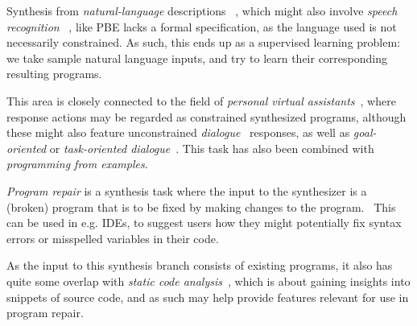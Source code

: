 \documentclass{article}
\begin{document}

Synthesis from \emph{natural-language} descriptions%
~\citep{neuralprogrammer,zhong2017seq2sql},
which might also involve \emph{speech recognition}%
~\citep{juang1991hidden,graves2013speech},
like PBE
lacks a formal specification,
as the language used is not necessarily constrained.
As such, this ends up as a supervised learning problem:
we take sample natural language inputs,
and try to learn their corresponding resulting programs.

This area is closely connected to the field of
\emph{personal virtual assistants}~\citep{virtualassistant,genie},
where response actions may be regarded as constrained synthesized programs,
although these might also feature unconstrained \emph{dialogue}~\citep{li2016deep} responses,
as well as \emph{goal-oriented} or \emph{task-oriented dialogue}~\citep{bordes2016goaldialogue,li2016taskdialogue}.
This task has also been combined with \emph{programming from examples}.~\citep{polosukhin2018neural}


\emph{Program repair} is a synthesis task where the input to the synthesizer is a (broken) program that is to be fixed by making changes to the program.~\citep{demsky2006inference,kaleeswaran2014minthint}
This can be used in e.g. IDEs, to suggest users how they might potentially fix syntax errors or misspelled variables in their code.

As the input to this synthesis branch consists of existing programs,
it also has quite some overlap with \emph{static code analysis}~\citep{louridas2006static,brockschmidt2018generative},
which is about gaining insights into snippets of source code,
and as such may help provide features relevant for use in program repair.

\end{document}
